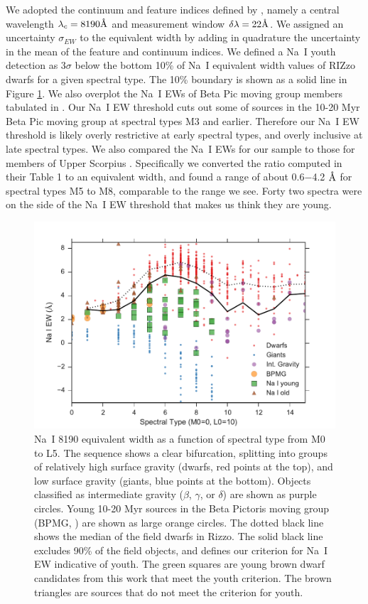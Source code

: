 We adopted the continuum and feature indices defined by \citet{2012AJ....143..114S}, namely a central wavelength $\lambda_c= 8190 \mbox{\normalfont\AA}$ and measurement window $\delta \lambda = 22 \mbox{\normalfont\AA}$.  We assigned an uncertainty $\sigma_{EW}$ to the equivalent width by adding in quadrature the uncertainty in the mean of the feature and continuum indices.  We defined a Na~I youth detection as 3$\sigma$ below the bottom 10\% of Na~I equivalent width values of RIZzo dwarfs for a given spectral type.  The 10\% boundary is shown as a solid line in Figure \ref{fig_NaI_EW}.  We also overplot the Na~I EWs of Beta Pic moving group members tabulated in \citet{2012AJ....143..114S}.  Our Na~I EW threshold cuts out some of sources in the 10-20 Myr Beta Pic moving group \citep{2012AJ....143..114S} at spectral types M3 and earlier.  Therefore our Na~I EW threshold is likely overly restrictive at early spectral types, and overly inclusive at late spectral types.  We also compared the Na~I EWs for our sample to those for members of Upper Scorpius \citep{2006AJ....131.3016S}.  Specifically we converted the ratio computed in their Table 1 to an equivalent width, and found a range of about 0.6$-$4.2 $\mbox{\normalfont\AA}$ for spectral types M5 to M8, comparable to the range we see.  Forty two spectra were on the side of the Na~I EW threshold that makes us think they are young.

\begin{figure}[ht!]
  \caption{Na~I 8190 equivalent width as a function of spectral type from M0 to L5.  The sequence shows a clear bifurcation, splitting into groups of relatively high surface gravity (dwarfs, red points at the top), and low surface gravity (giants, blue points at the bottom).  Objects classified as intermediate gravity ($\beta$, $\gamma$, or $\delta$) are shown as purple circles.  Young 10-20 Myr sources in the Beta Pictoris moving group (BPMG, \citet{2012AJ....143..114S}) are shown as large orange circles.  The dotted black line shows the median of the field dwarfs in Rizzo.  The solid black line excludes 90\% of the field objects, and defines our criterion for Na~I EW indicative of youth.  The green squares are young brown dwarf candidates from this work that meet the youth criterion.  The brown triangles are sources that do not meet the criterion for youth.\label{fig_NaI_EW} }
\centering
\includegraphics[scale=0.6]{chIMACS/figures/NaI_EW}
\end{figure}


